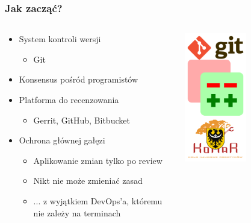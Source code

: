 \documentclass[xcolor=dvipsnames]{beamer}%
\begin{document}
\begin{frame}
	\frametitle{Jak zacząć?}
	\begin{columns}
		\begin{column}{0.5\textwidth}
			\begin{itemize}
				\item System kontroli wersji
				      \begin{itemize}
					      \item Git
				      \end{itemize}
				\item Konsensus pośród programistów
				\item Platforma do recenzowania
				      \begin{itemize}
					      \item Gerrit, GitHub, Bitbucket
				      \end{itemize}
				\item Ochrona głównej gałęzi
				      \begin{itemize}
					      \item Aplikowanie zmian tylko po review
					      \item Nikt nie może zmieniać zasad
					      \item ... z wyjątkiem DevOps'a, któremu nie zależy na terminach
				      \end{itemize}
			\end{itemize}
		\end{column}
		\begin{column}{0.5\textwidth}
			\begin{center}
				\includegraphics[width=0.5\textwidth,keepaspectratio]{figure/podstawy.png}
			\end{center}
		\end{column}
	\end{columns}
\end{frame}
\end{document}
